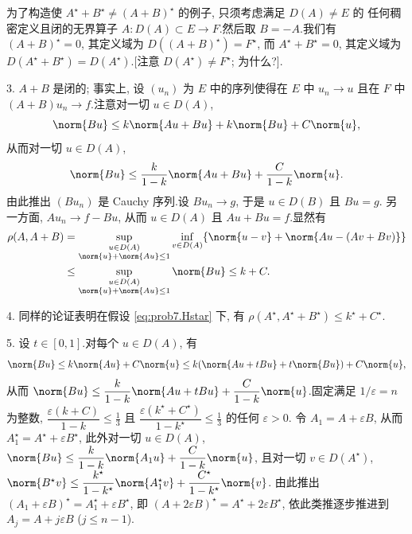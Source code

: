 
为了构造使 $A^\star+B^\star\ne(A+B)^\star$ 的例子, 只须考虑满足 $D(A)\ne E$ 的
任何稠密定义且闭的无界算子 $A:D(A)\subset E\to F$.然后取 $B=-A$.我们有
$(A+B)^\star=0$, 其定义域为 $D((A+B)^\star)=F^\star$, 而 $A^\star+B^\star=0$,
其定义域为 $D(A^\star+B^\star)=D(A^\star)$.[注意 $D(A^\star)\ne F^\star$; 为什么?].

3. $A+B$ 是闭的; 事实上, 设 $(u_n)$ 为 $E$ 中的序列使得在 $E$ 中 $u_n\to u$ 且在
$F$ 中 $(A+B)u_n\to f$.注意对一切 $u\in D(A)$,
\begin{equation*}
\norm{Bu}\le k\norm{Au+Bu}+k\norm{Bu}+C\norm{u},
\end{equation*}
从而对一切 $u\in D(A)$,
\begin{equation*}
\norm{Bu}\le\frac{k}{1-k}\norm{Au+Bu}+\frac{C}{1-k}\norm{u}.
\end{equation*}
由此推出 $(Bu_n)$ 是 Cauchy 序列.设 $Bu_n\to g$, 于是 $u\in D(B)$ 且 $Bu=g$.
另一方面, $Au_n\to f-Bu$, 从而 $u\in D(A)$ 且 $Au+Bu=f$.显然有
\begin{align*}
\rho(A,A+B)&=\sup_{\substack{u\in D(A)\\\norm{u}+\norm{Au}\le1}}\inf_{v\in D(A)}\{\norm{u-v}+\norm{Au-(Av+Bv)}\}\\
&\le\sup_{\substack{u\in D(A)\\\norm{u}+\norm{Au}\le1}}\norm{Bu}\le k+C.
\end{align*}

4. 同样的论证表明在假设 \eqref{eq:prob7.Hstar} 下, 有 $\rho(A^\star,A^\star+B^\star)\le k^\star+C^\star$.

5. 设 $t\in[0,1]$.对每个 $u\in D(A)$, 有
\begin{equation*}
\norm{Bu}\le k\norm{Au}+C\norm{u}\le k(\norm{Au+tBu}+t\norm{Bu})+C\norm{u},
\end{equation*}
从而 $\norm{Bu}\le\dfrac{k}{1-k}\norm{Au+tBu}+\dfrac{C}{1-k}\norm{u}$.固定满足
$1/\varepsilon=n$ 为整数, $\dfrac{\varepsilon(k+C)}{1-k}\le\frac13$ 且
$\dfrac{\varepsilon(k^\star+C^\star)}{1-k^\star}\le\frac13$ 的任何 $\varepsilon>0$.
令 $A_1=A+\varepsilon B$, 从而 $A_1^\star=A^\star+\varepsilon B^\star$, 此外对一切
$u\in D(A)$, $\norm{Bu}\le\dfrac{k}{1-k}\norm{A_1u}+\dfrac{C}{1-k}\norm{u}$, 且对一切
$v\in D(A^\star)$, $\norm{B^\star v}\le\dfrac{k^\star}{1-k^\star}\norm{A_1^\star v}+\dfrac{C^\star}{1-k^\star}\norm{v}$.
由此推出 $(A_1+\varepsilon B)^\star=A_1^\star+\varepsilon B^\star$, 即
$(A+2\varepsilon B)^\star=A^\star+2\varepsilon B^\star$, 依此类推逐步推进到
$A_j=A+j\varepsilon B$ ($j\le n-1$).


